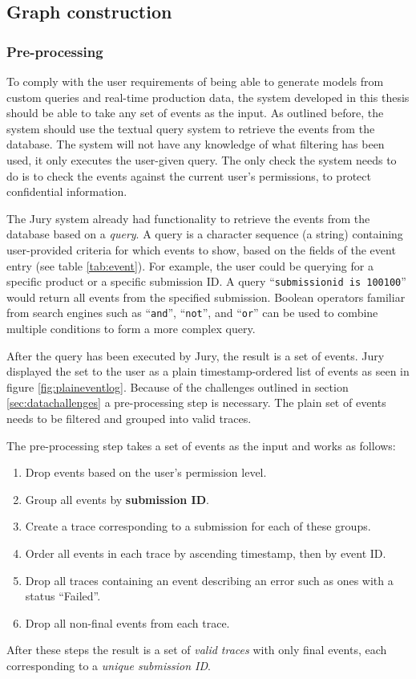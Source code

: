 \subsection{Graph construction}

\subsubsection{Pre-processing}

To comply with the user requirements of being able to generate models from custom queries and real-time production data, 
the system developed in this thesis should be able to take any set of events as the input.
As outlined before, the system should use the textual query system to retrieve the events from the database.
The system will not have any knowledge of what filtering has been used, it only executes the user-given query.
The only check the system needs to do is to check the events against the current user's permissions, to protect confidential information.

The Jury system already had functionality to retrieve the events from the database based on a \emph{query}.
A query is a character sequence (a string) containing user-provided criteria for which events to show, based on the fields of the event entry (see table \ref{tab:event}).
For example, the user could be querying for a specific product or a specific submission ID.
A query ``\texttt{submissionid is 100100}'' would return all events from the specified submission.
Boolean operators familiar from search engines such as ``\texttt{and}'', ``\texttt{not}'', and ``\texttt{or}'' can be used to combine multiple conditions to form a more complex query.

After the query has been executed by Jury, the result is a set of events.
Jury displayed the set to the user as a plain timestamp-ordered list of events as seen in figure \ref{fig:plaineventlog}.
Because of the challenges outlined in section \ref{sec:datachallenges} a pre-processing step is necessary.
The plain set of events needs to be filtered and grouped into valid traces.

The pre-processing step takes a set of events as the input and works as follows:
\begin{enumerate}
    \item Drop events based on the user's permission level.
    \item Group all events by \textbf{submission ID}.
    \item Create a trace corresponding to a submission for each of these groups.
    \item Order all events in each trace by ascending timestamp, then by event ID.
    \item Drop all traces containing an event describing an error such as ones with a status ``Failed''.
    \item Drop all non-final events from each trace.
\end{enumerate}
After these steps the result is a set of \textit{valid traces} with only final events, each corresponding to a \textit{unique submission ID}.

